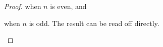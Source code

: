 \begin{proof}
when $n$ is even, and


when $n$ is odd. The result can be read off directly.

\cite{Hatcher}
\end{proof}
